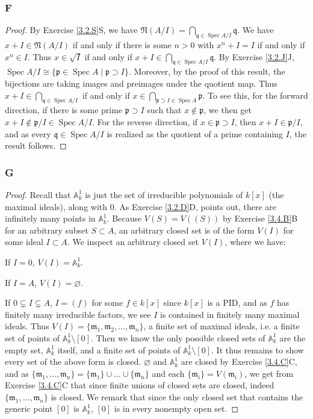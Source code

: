 \documentclass{article}
\newcommand{\A}{\mathbb{A}}
\newcommand{\frkm}{\mathfrak{m}}
\newcommand{\frkp}{\mathfrak{p}}
\newcommand{\frkq}{\mathfrak{q}}
\newcommand{\frkN}{\mathfrak{N}}
\DeclareMathOperator{\Spec}{\mathrm{Spec}}
\let\emptyset\varnothing
\begin{document}
\subsubsection{F}\label{3.4.F}
\begin{proof}
    By Exercise \ref{3.2.S}S, we have $\frkN(A/I)=\bigcap_{\frkq \in \Spec A/I} \frkq$. We have $x+I \in \frkN(A/I)$ if and only if there is some $n>0$ with $x^n +I=I$ if and only if $x^n \in I$. Thus $x\in \sqrt I$ if and only if $x+I \in \bigcap_{\frkq \in \Spec A/I} \frkq$. By Exercise \ref{3.2.J}J, $\Spec A/I \cong \{ \frkp \in \Spec A \mid \frkp \supset I\}$. Moreover, by the proof of this result, the bijections are taking images and preimages under the quotient map. Thus $x+I \in \bigcap_{\frkq \in \Spec A/I}$ if and only if $x\in \bigcap_{\frkp \supset I \in \Spec A} \frkp$. To see this, for the forward direction, if there is some prime $\frkp \supset I$ such that $x\notin \frkp$, we then get $x+I\notin \frkp/I\in \Spec A/I$. For the reverse direction, if $x\in \frkp \supset I$, then $x+I \in \frkp/I$, and as every $\frkq \in \Spec A/I$ is realized as the quotient of a prime containing $I$, the result follows.
\end{proof}
\subsubsection{G}\label{3.4.G}
\begin{proof}
    Recall that $\A^1_k$ is just the set of irreducible polynomials of $k[x]$ (the maximal ideals), along with $0$. As Exercise \ref{3.2.D}D, points out, there are infinitely many points in $\A^1_k$. Because $V(S)=V((S))$ by Exercise \ref{3.4.B}B for an arbitrary subset $S\subset A$, an arbitrary closed set is of the form $V(I)$ for some ideal $I\subset A$.
    We inspect an arbitrary closed set $V(I)$, where we have:

    If $I=0$, $V(I)=\A^1_k$.

    If $I=A$, $V(I)=\emptyset$.

    If $0\subsetneq I \subsetneq A$,  $I=(f)$ for some $f\in k[x]$ since $k[x]$ is a PID, and as $f$ has finitely many irreducible factors, we see $I$ is contained in finitely many maximal ideals. Thus $V(I)=\{\frkm_1,\frkm_2,\dots,\frkm_n\}$, a finite set of maximal ideals, i.e. a finite set of points of $\A^1_k\setminus [0]$. Then we know the only possible closed sets of $\A^1_k$ are the empty set, $\A^1_k$ itself, and a finite set of points of $\A^1_k \setminus [0]$. It thus remains to show every set of the above form is closed. $\emptyset$ and $\A^1_k$ are closed by Exercise \ref{3.4.C}C, and as $\{\frkm_1,\dots,\frkm_n\}=\{\frkm_1\}\cup \dots \cup \{\frkm_n\}$ and each $\{\frkm_i\} = V(\frkm_i)$, we get from Exercise \ref{3.4.C}C that since finite unions of closed sets are closed, indeed $\{\frkm_1,\dots,\frkm_n\}$ is closed. We remark that since the only closed set that contains the generic point $[0]$ is $\A^1_k$, $[0]$ is in every nonempty open set.
\end{proof}
\end{document}
